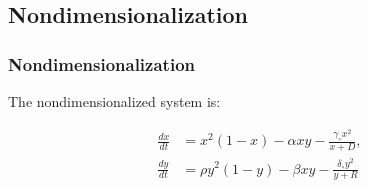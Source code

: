 
\subsection{Nondimensionalization}

\begin{frame}
\frametitle{Nondimensionalization}

  The nondimensionalized system is:

	\begin{align*}
		\frac{dx}{dt} &= x^2 (1-x) - \alpha xy - \frac{\gamma_\circ x^2}{x+D}, \\
    \frac{dy}{dt} &= \rho y^2 (1-y) - \beta xy -\frac{\delta_\circ y^2}{y+R}
	\end{align*}
\end{frame}

